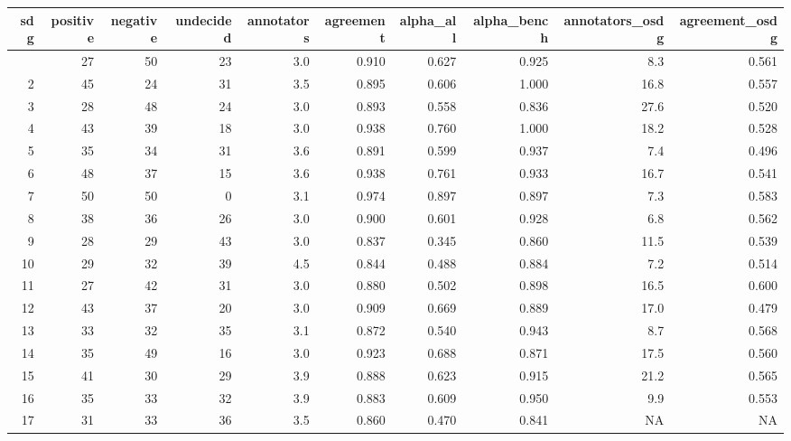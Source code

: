 \begin{table}[t]
\fontsize{12.0pt}{14.4pt}\selectfont
\begin{tabular*}{\linewidth}{@{\extracolsep{\fill}}rrrrrrrrrr}
\toprule
sdg & positive & negative & undecided & annotators & agreement & alpha\_all & alpha\_bench & annotators\_osdg & agreement\_osdg \\ 
\midrule\addlinespace[2.5pt]
1 & 27 & 50 & 23 & 3.0 & 0.910 & 0.627 & 0.925 & 8.3 & 0.561 \\ 
2 & 45 & 24 & 31 & 3.5 & 0.895 & 0.606 & 1.000 & 16.8 & 0.557 \\ 
3 & 28 & 48 & 24 & 3.0 & 0.893 & 0.558 & 0.836 & 27.6 & 0.520 \\ 
4 & 43 & 39 & 18 & 3.0 & 0.938 & 0.760 & 1.000 & 18.2 & 0.528 \\ 
5 & 35 & 34 & 31 & 3.6 & 0.891 & 0.599 & 0.937 & 7.4 & 0.496 \\ 
6 & 48 & 37 & 15 & 3.6 & 0.938 & 0.761 & 0.933 & 16.7 & 0.541 \\ 
7 & 50 & 50 & 0 & 3.1 & 0.974 & 0.897 & 0.897 & 7.3 & 0.583 \\ 
8 & 38 & 36 & 26 & 3.0 & 0.900 & 0.601 & 0.928 & 6.8 & 0.562 \\ 
9 & 28 & 29 & 43 & 3.0 & 0.837 & 0.345 & 0.860 & 11.5 & 0.539 \\ 
10 & 29 & 32 & 39 & 4.5 & 0.844 & 0.488 & 0.884 & 7.2 & 0.514 \\ 
11 & 27 & 42 & 31 & 3.0 & 0.880 & 0.502 & 0.898 & 16.5 & 0.600 \\ 
12 & 43 & 37 & 20 & 3.0 & 0.909 & 0.669 & 0.889 & 17.0 & 0.479 \\ 
13 & 33 & 32 & 35 & 3.1 & 0.872 & 0.540 & 0.943 & 8.7 & 0.568 \\ 
14 & 35 & 49 & 16 & 3.0 & 0.923 & 0.688 & 0.871 & 17.5 & 0.560 \\ 
15 & 41 & 30 & 29 & 3.9 & 0.888 & 0.623 & 0.915 & 21.2 & 0.565 \\ 
16 & 35 & 33 & 32 & 3.9 & 0.883 & 0.609 & 0.950 & 9.9 & 0.553 \\ 
17 & 31 & 33 & 36 & 3.5 & 0.860 & 0.470 & 0.841 & NA & NA \\ 
\bottomrule
\end{tabular*}
\end{table}

